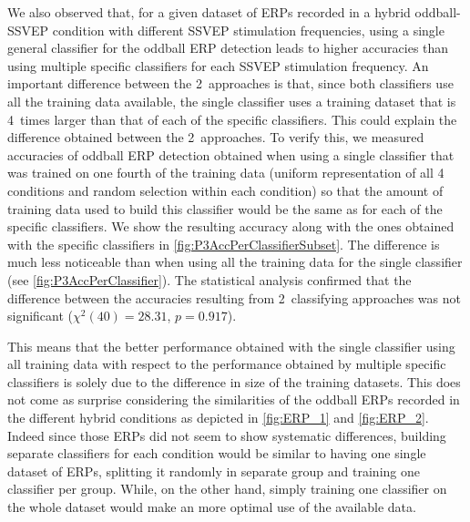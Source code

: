 \documentclass[10pt]{article}
\begin{document}
    We also observed that, for a given dataset of ERPs recorded in a hybrid oddball-SSVEP condition with different SSVEP stimulation frequencies, using a single general classifier for the oddball ERP detection leads to higher accuracies than using multiple specific classifiers for each SSVEP stimulation frequency.
    An important difference between the 2~approaches is that, since both classifiers use all the training data available, the single classifier uses a training dataset that is 4~times larger than that of each of the specific classifiers.
    This could explain the difference obtained between the 2~approaches.
    To verify this, we measured accuracies of oddball ERP detection obtained when using a single classifier that was trained on one fourth of the training data (uniform representation of all 4 conditions and random selection within each condition) so that the amount of training data used to build this classifier would be the same as for each of the specific classifiers.
    We show the resulting accuracy along with the ones obtained with the specific classifiers in \autoref{fig:P3AccPerClassifierSubset}.
    The difference is much less noticeable than when using all the training data for the single classifier (see \autoref{fig:P3AccPerClassifier}).
    The statistical analysis confirmed that the difference between the accuracies resulting from 2~classifying approaches was not significant ($\chi^2(40)=28.31$, $p=0.917$).

    This means that the better performance obtained with the single classifier using all training data with respect to the performance obtained by multiple specific classifiers is solely due to the difference in size of the training datasets.
    This does not come as surprise considering the similarities of the oddball ERPs recorded in the different hybrid conditions as depicted in \autoref{fig:ERP_1} and \autoref{fig:ERP_2}.
    Indeed since those ERPs did not seem to show systematic differences, building separate classifiers for each condition would be similar to having one single dataset of ERPs, splitting it randomly in separate group and training one classifier per group.
    While, on the other hand, simply training one classifier on the whole dataset would make an more optimal use of the available data.
\end{document}
